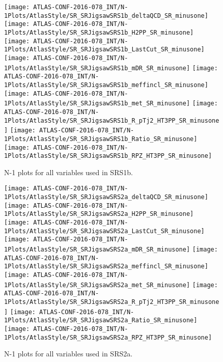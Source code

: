 \begin{figure}[tbp]
\begin{center}
\texttt{[image: ATLAS-CONF-2016-078\_INT/N-1Plots/AtlasStyle/SR\_SRJigsawSRS1b\_deltaQCD\_SR\_minusone]}
\texttt{[image: ATLAS-CONF-2016-078\_INT/N-1Plots/AtlasStyle/SR\_SRJigsawSRS1b\_H2PP\_SR\_minusone]}
\texttt{[image: ATLAS-CONF-2016-078\_INT/N-1Plots/AtlasStyle/SR\_SRJigsawSRS1b\_LastCut\_SR\_minusone]}
\texttt{[image: ATLAS-CONF-2016-078\_INT/N-1Plots/AtlasStyle/SR\_SRJigsawSRS1b\_mDR\_SR\_minusone]}
\texttt{[image: ATLAS-CONF-2016-078\_INT/N-1Plots/AtlasStyle/SR\_SRJigsawSRS1b\_meffincl\_SR\_minusone]}
\texttt{[image: ATLAS-CONF-2016-078\_INT/N-1Plots/AtlasStyle/SR\_SRJigsawSRS1b\_met\_SR\_minusone]}
\texttt{[image: ATLAS-CONF-2016-078\_INT/N-1Plots/AtlasStyle/SR\_SRJigsawSRS1b\_R\_pTj2\_HT3PP\_SR\_minusone]}
\texttt{[image: ATLAS-CONF-2016-078\_INT/N-1Plots/AtlasStyle/SR\_SRJigsawSRS1b\_Ratio\_SR\_minusone]}
\texttt{[image: ATLAS-CONF-2016-078\_INT/N-1Plots/AtlasStyle/SR\_SRJigsawSRS1b\_RPZ\_HT3PP\_SR\_minusone]}
\end{center}
\caption{N-1 plots for all variables used in SRS1b.}
\label{fig:SR_SRJigsawSRS1b_H2PP_SR_minusone}
\end{figure}

\begin{figure}[tbp]
\begin{center}
\texttt{[image: ATLAS-CONF-2016-078\_INT/N-1Plots/AtlasStyle/SR\_SRJigsawSRS2a\_deltaQCD\_SR\_minusone]}
\texttt{[image: ATLAS-CONF-2016-078\_INT/N-1Plots/AtlasStyle/SR\_SRJigsawSRS2a\_H2PP\_SR\_minusone]}
\texttt{[image: ATLAS-CONF-2016-078\_INT/N-1Plots/AtlasStyle/SR\_SRJigsawSRS2a\_LastCut\_SR\_minusone]}
\texttt{[image: ATLAS-CONF-2016-078\_INT/N-1Plots/AtlasStyle/SR\_SRJigsawSRS2a\_mDR\_SR\_minusone]}
\texttt{[image: ATLAS-CONF-2016-078\_INT/N-1Plots/AtlasStyle/SR\_SRJigsawSRS2a\_meffincl\_SR\_minusone]}
\texttt{[image: ATLAS-CONF-2016-078\_INT/N-1Plots/AtlasStyle/SR\_SRJigsawSRS2a\_met\_SR\_minusone]}
\texttt{[image: ATLAS-CONF-2016-078\_INT/N-1Plots/AtlasStyle/SR\_SRJigsawSRS2a\_R\_pTj2\_HT3PP\_SR\_minusone]}
\texttt{[image: ATLAS-CONF-2016-078\_INT/N-1Plots/AtlasStyle/SR\_SRJigsawSRS2a\_Ratio\_SR\_minusone]}
\texttt{[image: ATLAS-CONF-2016-078\_INT/N-1Plots/AtlasStyle/SR\_SRJigsawSRS2a\_RPZ\_HT3PP\_SR\_minusone]}
\end{center}
\caption{N-1 plots for all variables used in SRS2a.}
\label{fig:SR_SRJigsawSRS1b_Ratio_SR_minusone}
\end{figure}


